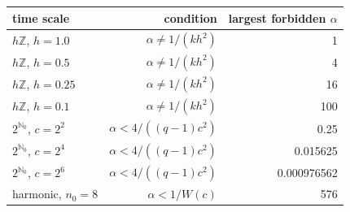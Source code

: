 \begin{tabular}{lrr}
\toprule
time scale & condition & largest forbidden $\alpha$ \\
\midrule
$h\mathbb{Z}$, $h=1.0$ & $\alpha\neq 1/(kh^2)$ & 1 \\
$h\mathbb{Z}$, $h=0.5$ & $\alpha\neq 1/(kh^2)$ & 4 \\
$h\mathbb{Z}$, $h=0.25$ & $\alpha\neq 1/(kh^2)$ & 16 \\
$h\mathbb{Z}$, $h=0.1$ & $\alpha\neq 1/(kh^2)$ & 100 \\
$2^{\mathbb{N}_0}$, $c=2^{2}$ & $\alpha<4/((q-1)c^2)$ & 0.25 \\
$2^{\mathbb{N}_0}$, $c=2^{4}$ & $\alpha<4/((q-1)c^2)$ & 0.015625 \\
$2^{\mathbb{N}_0}$, $c=2^{6}$ & $\alpha<4/((q-1)c^2)$ & 0.000976562 \\
harmonic, $n_0=8$ & $\alpha<1/W(c)$ & 576 \\
\bottomrule
\end{tabular}
